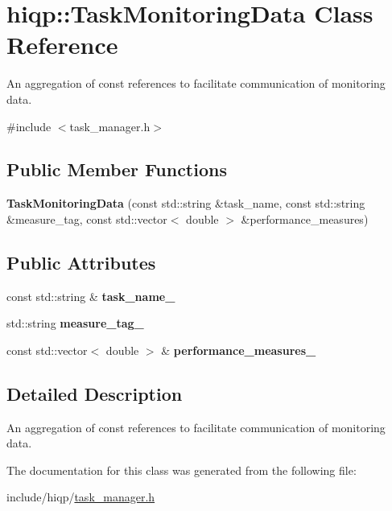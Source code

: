 \hypertarget{classhiqp_1_1TaskMonitoringData}{\section{hiqp\-:\-:Task\-Monitoring\-Data Class Reference}
\label{classhiqp_1_1TaskMonitoringData}
}


An aggregation of const references to facilitate communication of monitoring data.  




{\ttfamily \#include $<$task\-\_\-manager.\-h$>$}

\subsection*{Public Member Functions}
\begin{DoxyCompactItemize}
\item 
\hypertarget{classhiqp_1_1TaskMonitoringData_a33f6baf4d20a2ef1a7e89e4e7ea3ef7b}{{\bfseries Task\-Monitoring\-Data} (const std\-::string \&task\-\_\-name, const std\-::string \&measure\-\_\-tag, const std\-::vector$<$ double $>$ \&performance\-\_\-measures)}\label{classhiqp_1_1TaskMonitoringData_a33f6baf4d20a2ef1a7e89e4e7ea3ef7b}

\end{DoxyCompactItemize}
\subsection*{Public Attributes}
\begin{DoxyCompactItemize}
\item 
\hypertarget{classhiqp_1_1TaskMonitoringData_a51d485d0b298dd0e4859744cf33a8227}{const std\-::string \& {\bfseries task\-\_\-name\-\_\-}}\label{classhiqp_1_1TaskMonitoringData_a51d485d0b298dd0e4859744cf33a8227}

\item 
\hypertarget{classhiqp_1_1TaskMonitoringData_af27f6d903e69473949feb16e2e82cd69}{std\-::string {\bfseries measure\-\_\-tag\-\_\-}}\label{classhiqp_1_1TaskMonitoringData_af27f6d903e69473949feb16e2e82cd69}

\item 
\hypertarget{classhiqp_1_1TaskMonitoringData_a693c5b1df002e1558df125f268057e91}{const std\-::vector$<$ double $>$ \& {\bfseries performance\-\_\-measures\-\_\-}}\label{classhiqp_1_1TaskMonitoringData_a693c5b1df002e1558df125f268057e91}

\end{DoxyCompactItemize}


\subsection{Detailed Description}
An aggregation of const references to facilitate communication of monitoring data. 

The documentation for this class was generated from the following file\-:\begin{DoxyCompactItemize}
\item 
include/hiqp/\hyperlink{task__manager_8h}{task\-\_\-manager.\-h}\end{DoxyCompactItemize}
